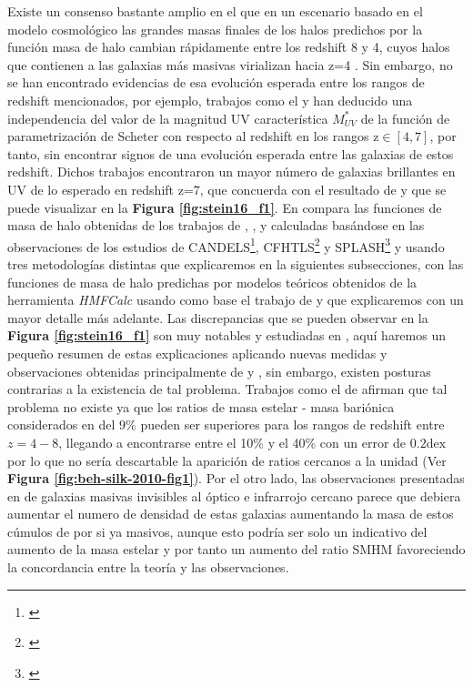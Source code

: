Existe un consenso bastante amplio en el que en un escenario basado en el modelo cosmológico \lcdm las grandes masas finales de los halos predichos por la función masa de halo cambian rápidamente entre los redshift 8 y 4, cuyos halos que contienen a las galaxias más masivas virializan hacia z=4 \citep{steinhardt2016impossibly}. Sin embargo, no se han encontrado evidencias de esa evolución esperada entre los rangos de redshift mencionados, por ejemplo, trabajos como el \cite{finkelstein2015increasing} y \cite{finkelstein2015evolution} han deducido una independencia del valor de la magnitud UV característica $M^*_{UV}$ de la función de  parametrización de Scheter con respecto al redshift en los rangos z$\in [4,7]$, por tanto, sin encontrar signos de una evolución esperada entre las galaxias de estos redshift. Dichos trabajos encontraron un mayor número de galaxias brillantes en UV de lo esperado en redshift z=7, que concuerda con el resultado de \cite{steinhardt2016impossibly} y que se puede visualizar en la \textbf{Figura \ref{fig:stein16_f1}}. En \cite{steinhardt2016impossibly} compara las funciones de masa de halo obtenidas de los trabajos de \cite{hildebrandt2009cars}, \cite{steinhardt2014uniform}, \cite{bouwens2015reionization} y \cite{bouwens2015uv} calculadas basándose en las observaciones de los estudios de CANDELS\footnote{\cite{grogin2011candels}}, CFHTLS\footnote{\cite{hildebrandt2009cars}} y SPLASH\footnote{\cite{capak2012splash}} y usando tres metodologías distintas que explicaremos en la siguientes subsecciones, con las funciones de masa de halo predichas por modelos teóricos obtenidos de la herramienta \textit{HMFCalc} \citep{murray2013hmfcalc} usando como base el trabajo de \cite{sheth2001ellipsoidal} y que explicaremos con un mayor detalle más adelante. Las discrepancias que se pueden observar en la \textbf{Figura \ref{fig:stein16_f1}} son muy notables y estudiadas en \cite{steinhardt2016impossibly}, aquí haremos un pequeño resumen de estas explicaciones aplicando nuevas medidas y observaciones obtenidas principalmente de \cite{behroozi2019universemachine} y \cite{wang2019dominant}, sin embargo, existen posturas contrarias a la existencia de tal problema. Trabajos como el de \cite{behroozi2018mostmassive} afirman que tal problema no existe ya que los ratios de masa estelar - masa bariónica considerados en \cite{steinhardt2016impossibly} del $9\%$ pueden ser superiores para los rangos de redshift entre $z=4-8$, llegando a encontrarse entre el 10\% y el 40\% con un error de $0.2\mathrm{dex}$ por lo que no sería descartable la aparición de ratios cercanos a la unidad (Ver \textbf{Figura \ref{fig:beh-silk-2010-fig1}}). Por el otro lado, las observaciones presentadas en \cite{wang2019dominant} de galaxias masivas invisibles al óptico e infrarrojo cercano parece que debiera aumentar el numero de densidad de estas galaxias aumentando la masa de estos cúmulos de por si ya masivos, aunque esto podría ser solo un indicativo del aumento de la masa estelar y por tanto un aumento del ratio SMHM favoreciendo la concordancia entre la teoría y las observaciones. \\

